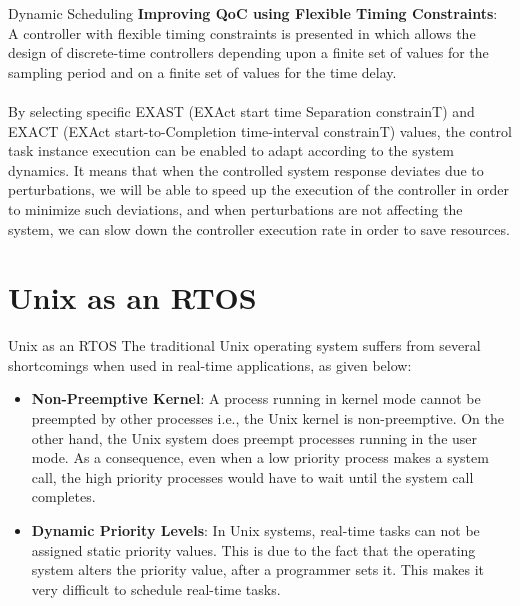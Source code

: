 \documentclass{beamer}
\begin{document}
\begin{frame}{Dynamic Scheduling}
\textbf{Improving QoC using Flexible Timing Constraints}: A controller with flexible timing constraints is presented in \cite{qoc} which allows the design of discrete-time controllers depending upon a finite set of values for the sampling period and on a finite set of values for the time delay.  \\~\\

By selecting specific EXAST (EXAct start time Separation constrainT) and  EXACT (EXAct start-to-Completion time-interval constrainT) values, the control task instance execution can be enabled to adapt according to the system dynamics. It means that when the controlled system response deviates due to perturbations, we will be able to speed up the execution of the controller in order to minimize such deviations, and when perturbations are not affecting the system, we can slow down the controller execution rate in order to save resources.
\end{frame}

\section{Unix as an RTOS}
\begin{frame}{Unix as an RTOS}
The traditional Unix operating system suffers from several
shortcomings when used in real-time applications, as given below: 
\begin{itemize}
    \item \textbf{Non-Preemptive Kernel}: A process running in kernel mode cannot be preempted by other processes i.e., the Unix kernel is non-preemptive. On the other hand, the Unix system does preempt processes running in the user mode. As a consequence, even when a low priority process makes a system call, the high priority processes would have to wait until the system call completes. 
    \item \textbf{Dynamic Priority Levels}: In Unix systems, real-time tasks can not be assigned static priority values. This is due to the fact that the operating system alters the priority value, after a programmer sets it. This makes it very difficult to schedule real-time tasks. 
\end{itemize}
\end{frame}
\end{document}
